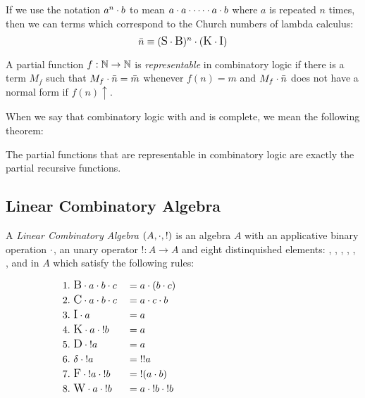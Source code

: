 If we use the notation $a^n \. b$ to mean $a\.a\.\cdots\.a\.b$ where $a$ is repeated $n$ times,
then we can terms which correspond to the Church numbers of lambda calculus:
\[
  \bar{n}\equiv (\Sc\.\Bc)^n\.(\Kc\.\Ic)
\]

\begin{definition}\label{def:functions_representable_in_combinatory_logic}
  A partial function $f:\nat \to \nat$ is \emph{representable} in combinatory logic if there is a
  term $M_f$ such that $M_f\.\bar{n} = \bar{m}$ whenever $f(n) = m$ and $M_f\.\bar{n} $ does not
  have a normal form if $f(n)\uparrow$.
\end{definition}

When we say that combinatory logic with \Sc and \Kc is complete, we mean the following theorem:
\begin{theorem}\label{thm:combinatory_logic_is_complete}
  The partial functions that are representable in combinatory logic are exactly the partial
  recursive functions.
\end{theorem}


\subsection{Linear Combinatory Algebra} %
\label{sub:linear_combinatory_algebra}

\begin{definition}\label{def:linear_combinatory_algebra}
  A \emph{Linear Combinatory Algebra} $(A,\.,!)$ is an algebra $A$ with an applicative binary
  operation $\.$, an unary operator $!:A\to A$ and eight distinquished elements: \Bc, \Cc, \Ic,
  \Kc, \Dc, \dc, \Fc and \Wc in $A$ which satisfy the following rules:
  \begin{singlespace}
    \begin{align*}
      &1.\ \Bc\. a\.b\.c     &&=a\.(b\.c)&\qquad\qquad\qquad\qquad\qquad\qquad\\
      &2.\ \Cc \. a\.b\.c    &&=a\.c\.b\\
      &3.\ \Ic \. a          &&=a\\
      &4.\ \Kc \. a\.{!}b    &&=a\\
      &5.\ \Dc\.{!}a         &&=a\\
      &6.\ \dc\.{!}a         &&={!!}a\\
      &7.\ \Fc\.{!}a\.{!}b   &&={!}(a\.b)\\
      &8.\ \Wc\. a\.{!}b     && = a\.{!}b\.{!}b
    \end{align*}
  \end{singlespace}
\end{definition}

